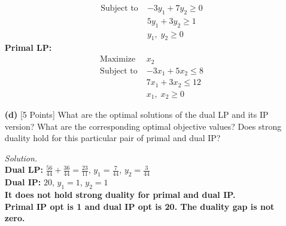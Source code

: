 \documentclass[10pt]{article}
\begin{document}
\begin{itemize}
\begin{mdframed}
\begin{align*}
            &\text{Subject to} \; &-3y_1+7y_2 \geq 0\\
                        & &5y_1+3y_2 \geq 1\\
                        & &y_1, \; y_2 \geq 0
        \end{align*}
        \textbf{Primal LP:}
        \begin{align*}
            &\text{Maximize} \; &x_2\\
            &\text{Subject to} \; &-3x_1 + 5x_2 \leq 8\\
                        & &7x_1 + 3x_2 \leq 12\\
                        & &x_1, \; x_2 \geq 0
        \end{align*}
    \end{mdframed}
    \item [\textbf{(d)}] {[5 Points]} What are the optimal solutions of the dual LP and its IP version? What are the corresponding optimal objective values? Does strong duality hold for this particular pair of primal and dual IP?
    \begin{mdframed}
        \textit{Solution.}\\
        \textbf{Dual LP:} $\frac{56}{44} + \frac{36}{44} = \frac{23}{11}$, $y_1 = \frac{7}{44}$, $y_2 = \frac{3}{44}$\\
        \textbf{Dual IP:} $20$, $y_1 = 1$, $y_2 = 1$\\
        \textbf{It does not hold strong duality for primal and dual IP.\\ Primal IP opt is 1 and dual IP opt is 20. The duality gap is not zero.}
    \end{mdframed}
\end{itemize}
\end{document}
